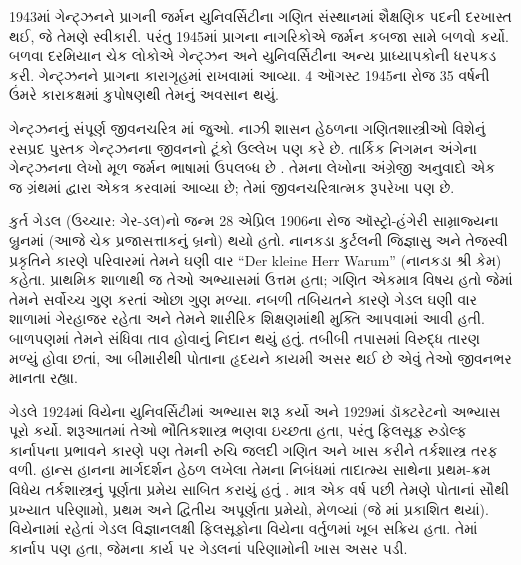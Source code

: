 1943માં ગેન્ટ્ઝનને પ્રાગની જર્મન યુનિવર્સિટીના
ગણિત સંસ્થાનમાં શૈક્ષણિક પદની દરખાસ્ત થઈ,
જે તેમણે સ્વીકારી. પરંતુ 1945માં પ્રાગના
નાગરિકોએ જર્મન કબજા સામે બળવો કર્યો.
બળવા દરમિયાન ચેક લોકોએ ગેન્ટ્ઝન અને યુનિવર્સિટીના
અન્ય પ્રાધ્યાપકોની ધરપકડ કરી. ગેન્ટ્ઝનને
પ્રાગના કારાગૃહમાં રાખવામાં આવ્યા.
4 ઑગસ્ટ 1945ના રોજ 35 વર્ષની ઉંમરે
કારાકક્ષમાં કુપોષણથી તેમનું અવસાન થયું.


\begin{reading}
ગેન્ટ્ઝનનું સંપૂર્ણ જીવનચરિત્ર \citet{Menzler-Trott2007}માં
જુઓ. નાઝી શાસન હેઠળના ગણિતશાસ્ત્રીઓ વિશેનું
રસપ્રદ પુસ્તક \citet{Segal2014} ગેન્ટ્ઝનના
જીવનનો ટૂંકો ઉલ્લેખ પણ કરે છે.
તાર્કિક નિગમન અંગેના ગેન્ટ્ઝનના લેખો મૂળ
જર્મન ભાષામાં ઉપલબ્ધ છે
\citep{Gentzen1935a,Gentzen1935b}. તેમના લેખોના
અંગ્રેજી અનુવાદો એક જ ગ્રંથમાં
\citet{Gentzen1969} દ્વારા એકત્ર કરવામાં આવ્યા છે;
તેમાં જીવનચરિત્રાત્મક રૂપરેખા પણ છે.
\end{reading}
\endgroup


\begingroup
\makeatletter{}\makeatother


\label{guunit:OLP-0625}



કુર્ત ગેડલ (ઉચ્ચાર: ગેર-ડલ)નો જન્મ 28 એપ્રિલ
1906ના રોજ ઑસ્ટ્રો-હંગેરી સામ્રાજ્યના બ્રુનમાં
(આજે ચેક પ્રજાસત્તાકનું બ્રનો) થયો હતો. નાનકડા
કુર્ટલની જિજ્ઞાસુ અને તેજસ્વી પ્રકૃતિને કારણે
પરિવારમાં તેમને ઘણી વાર “Der kleine Herr Warum”
(નાનકડા શ્રી કેમ) કહેતા. પ્રાથમિક શાળાથી જ
તેઓ અભ્યાસમાં ઉત્તમ હતા; ગણિત એકમાત્ર વિષય
હતો જેમાં તેમને સર્વોચ્ચ ગુણ કરતાં ઓછા ગુણ
મળ્યા. નબળી તબિયતને કારણે ગેડલ ઘણી વાર
શાળામાં ગેરહાજર રહેતા અને તેમને શારીરિક
શિક્ષણમાંથી મુક્તિ આપવામાં આવી હતી. બાળપણમાં
તેમને સંધિવા તાવ હોવાનું નિદાન થયું હતું.
તબીબી તપાસમાં વિરુદ્ધ તારણ મળ્યું હોવા
છતાં, આ બીમારીથી પોતાના હૃદયને કાયમી
અસર થઈ છે એવું તેઓ જીવનભર માનતા રહ્યા.

ગેડલે 1924માં વિયેના યુનિવર્સિટીમાં અભ્યાસ
શરૂ કર્યો અને 1929માં ડૉક્ટરેટનો અભ્યાસ
પૂરો કર્યો. શરૂઆતમાં તેઓ ભૌતિકશાસ્ત્ર
ભણવા ઇચ્છતા હતા, પરંતુ ફિલસૂફ રુડોલ્ફ
કાર્નાપના પ્રભાવને કારણે પણ તેમની રુચિ
જલદી ગણિત અને ખાસ કરીને તર્કશાસ્ત્ર તરફ
વળી. હાન્સ હાનના માર્ગદર્શન હેઠળ લખેલા
તેમના નિબંધમાં તાદાત્મ્ય સાથેના પ્રથમ-ક્રમ
વિધેય તર્કશાસ્ત્રનું પૂર્ણતા પ્રમેય સાબિત
કરાયું હતું \citep{Godel1929}. માત્ર એક
વર્ષ પછી તેમણે પોતાનાં સૌથી પ્રખ્યાત
પરિણામો, પ્રથમ અને દ્વિતીય અપૂર્ણતા
પ્રમેયો, મેળવ્યાં (જે
\citealt{Godel1931}માં પ્રકાશિત થયાં).
વિયેનામાં રહેતાં ગેડલ વિજ્ઞાનલક્ષી
ફિલસૂફોના વિયેના વર્તુળમાં ખૂબ સક્રિય
હતા. તેમાં કાર્નાપ પણ હતા, જેમના
કાર્ય પર ગેડલનાં પરિણામોની ખાસ અસર પડી.

